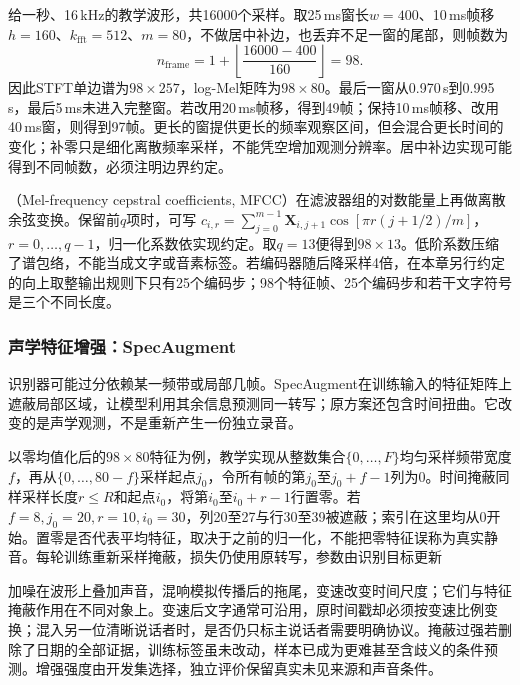 给一秒、16\,kHz的教学波形，共16000个采样。取25\,ms窗长$w=400$、10\,ms帧移$h=160$、$k_{\mathrm{fft}}=512$、$m=80$，不做居中补边，也丢弃不足一窗的尾部，则帧数为
\begin{equation}
 n_{\mathrm{frame}}=
 1+\left\lfloor\frac{16000-400}{160}\right\rfloor=98.
 \label{eq:nlp-speech-frame-count}
\end{equation}
因此STFT单边谱为$98\times257$，log-Mel矩阵为$98\times80$。最后一窗从0.970\,s到0.995\,s，最后5\,ms未进入完整窗。若改用20\,ms帧移，得到49帧；保持10\,ms帧移、改用40\,ms窗，则得到97帧。更长的窗提供更长的频率观察区间，但会混合更长时间的变化；补零只是细化离散频率采样，不能凭空增加观测分辨率。居中补边实现可能得到不同帧数，必须注明边界约定。

（Mel-frequency cepstral coefficients, MFCC）在滤波器组的对数能量上再做离散余弦变换。保留前$q$项时，可写
$c_{i,r}=\sum_{j=0}^{m-1}\bm{X}_{i,j+1}\cos[\pi r(j+1/2)/m]$，
$r=0,\ldots,q-1$，归一化系数依实现约定。取$q=13$便得到$98\times13$。低阶系数压缩了谱包络，不能当成文字或音素标签。若编码器随后降采样4倍，在本章另行约定的向上取整输出规则下只有25个编码步；98个特征帧、25个编码步和若干文字符号是三个不同长度。

\subsubsection{声学特征增强：SpecAugment}
\label{sec:nlp-speech-specaugment}

识别器可能过分依赖某一频带或局部几帧。SpecAugment在训练输入的特征矩阵上遮蔽局部区域，让模型利用其余信息预测同一转写；原方案还包含时间扭曲。它改变的是声学观测，不是重新产生一份独立录音。

以零均值化后的$98\times80$特征为例，教学实现从整数集合$\{0,\ldots,F\}$均匀采样频带宽度$f$，再从$\{0,\ldots,80-f\}$采样起点$j_0$，令所有帧的第$j_0$至$j_0+f-1$列为0。时间掩蔽同样采样长度$r\leq R$和起点$i_0$，将第$i_0$至$i_0+r-1$行置零。若$f=8,j_0=20,r=10,i_0=30$，列20至27与行30至39被遮蔽；索引在这里均从0开始。置零是否代表平均特征，取决于之前的归一化，不能把零特征误称为真实静音。每轮训练重新采样掩蔽，损失仍使用原转写，参数由识别目标更新

加噪在波形上叠加声音，混响模拟传播后的拖尾，变速改变时间尺度；它们与特征掩蔽作用在不同对象上。变速后文字通常可沿用，原时间戳却必须按变速比例变换；混入另一位清晰说话者时，是否仍只标主说话者需要明确协议。掩蔽过强若删除了日期的全部证据，训练标签虽未改动，样本已成为更难甚至含歧义的条件预测。增强强度由开发集选择，独立评价保留真实未见来源和声音条件。

